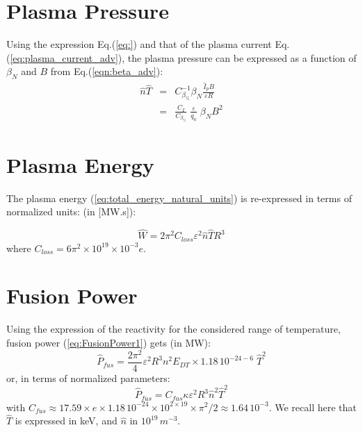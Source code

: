 \section{Plasma Pressure}
Using the expression Eq.(\ref{eq:}) and that of the plasma current Eq.(\ref{eq:plasma_current_adv}), the plasma pressure can be expressed as a function of $\beta_N$ and $B$ from Eq.(\ref{eqn:beta_adv}):
\begin{eqnarray}
\hat n\hat T &=& C_{\beta_\%}^{-1} \beta_N \frac{\hat I_p B}{\varepsilon R} \nonumber \\
&=& \frac{C_I}{C_{\beta_\%}}\; \frac{\varepsilon}{q_a} \;  \beta_N B^2
\label{eqn:nT_betaN_adv}
\end{eqnarray}

\section{Plasma Energy}
The plasma energy (\ref{eq:total_energy_natural_units}) is re-expressed in terms of normalized units: (in [MW.s]):

\begin{equation}
\hat W = 2\pi^2 C_{loss}  \varepsilon^2  \hat n \hat T R^3
\label{eq:total_energy}
\end{equation}
where $C_{loss} = 6 \pi^2 \times 10^{19} \times 10^{-3} e$.



\section{Fusion Power}
Using the expression of the reactivity for the considered range of temperature, fusion power (\ref{eq:FusionPower1}) gets (in MW):
\begin{equation}
\hat P_{fus} 
=
\frac{2\pi^2}{4}
\varepsilon^2 R^3
n^2 E_{DT}
\times
1.18\, 10^{-24-6}\; \hat T^2 
\end{equation}
or, in terms of normalized parameters:
\begin{equation}
\boxed{
	\hat P_{fus} 
	=
	C_{fus} \kappa \varepsilon^2 R^3 \hat n^2 \hat T^2
}
\label{eq:DT_fusion_power_adv}
\end{equation}
with $C_{fus} \approx 17.59 \times e\times 1.18\, 10^{-24} \times 10^{2\times19}\times \pi^2/2 \approx 1.64\, 10^{-3}$. We recall here that $\hat T$ is expressed in keV, and $\hat n$ in $10^{19} \, \si{m^{-3}}$. 



